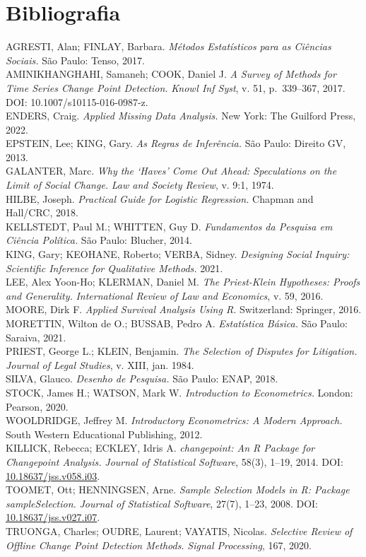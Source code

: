\documentclass[
  letterpaper,
  DIV=11,
  numbers=noendperiod]{scrreprt}
\begin{document}
\section{Bibliografia}\label{bibliografia}

AGRESTI, Alan; FINLAY, Barbara. \emph{Métodos Estatísticos para as
Ciências Sociais.} São Paulo: Tenso, 2017.\\
AMINIKHANGHAHI, Samaneh; COOK, Daniel J. \emph{A Survey of Methods for
Time Series Change Point Detection.} \emph{Knowl Inf Syst}, v. 51,
p.~339--367, 2017. DOI: 10.1007/s10115-016-0987-z.\\
ENDERS, Craig. \emph{Applied Missing Data Analysis.} New York: The
Guilford Press, 2022.\\
EPSTEIN, Lee; KING, Gary. \emph{As Regras de Inferência.} São Paulo:
Direito GV, 2013.\\
GALANTER, Marc. \emph{Why the `Haves' Come Out Ahead: Speculations on
the Limit of Social Change.} \emph{Law and Society Review}, v. 9:1,
1974.\\
HILBE, Joseph. \emph{Practical Guide for Logistic Regression.} Chapman
and Hall/CRC, 2018.\\
KELLSTEDT, Paul M.; WHITTEN, Guy D. \emph{Fundamentos da Pesquisa em
Ciência Política.} São Paulo: Blucher, 2014.\\
KING, Gary; KEOHANE, Roberto; VERBA, Sidney. \emph{Designing Social
Inquiry: Scientific Inference for Qualitative Methods.} 2021.\\
LEE, Alex Yoon-Ho; KLERMAN, Daniel M. \emph{The Priest-Klein Hypotheses:
Proofs and Generality.} \emph{International Review of Law and
Economics}, v. 59, 2016.\\
MOORE, Dirk F. \emph{Applied Survival Analysis Using R.} Switzerland:
Springer, 2016.\\
MORETTIN, Wilton de O.; BUSSAB, Pedro A. \emph{Estatística Básica.} São
Paulo: Saraiva, 2021.\\
PRIEST, George L.; KLEIN, Benjamin. \emph{The Selection of Disputes for
Litigation.} \emph{Journal of Legal Studies}, v. XIII, jan. 1984.\\
SILVA, Glauco. \emph{Desenho de Pesquisa.} São Paulo: ENAP, 2018.\\
STOCK, James H.; WATSON, Mark W. \emph{Introduction to Econometrics.}
London: Pearson, 2020.\\
WOOLDRIDGE, Jeffrey M. \emph{Introductory Econometrics: A Modern
Approach.} South Western Educational Publishing, 2012.\\
KILLICK, Rebecca; ECKLEY, Idris A. \emph{changepoint: An R Package for
Changepoint Analysis.} \emph{Journal of Statistical Software}, 58(3),
1--19, 2014. DOI:
\href{https://doi.org/10.18637/jss.v058.i03}{10.18637/jss.v058.i03}.\\
TOOMET, Ott; HENNINGSEN, Arne. \emph{Sample Selection Models in R:
Package sampleSelection.} \emph{Journal of Statistical Software}, 27(7),
1--23, 2008. DOI:
\href{https://doi.org/10.18637/jss.v027.i07}{10.18637/jss.v027.i07}.\\
TRUONGA, Charles; OUDRE, Laurent; VAYATIS, Nicolas. \emph{Selective
Review of Offline Change Point Detection Methods.} \emph{Signal
Processing}, 167, 2020.
\end{document}
